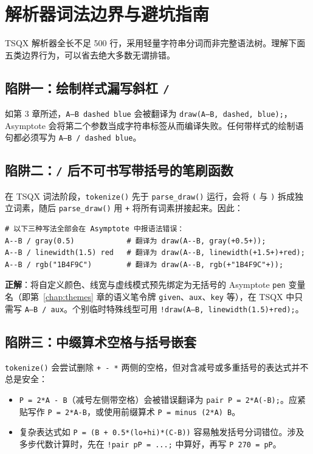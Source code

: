 \documentclass[11pt,oneside,fontset=none]{ctexbook}
\newcommand{\code}[1]{\texttt{#1}}
\begin{document}
\chapter{解析器词法边界与避坑指南}
\label{chap:pitfalls}

TSQX 解析器全长不足 500 行，采用轻量字符串分词而非完整语法树。理解下面五类边界行为，可以省去绝大多数无谓排错。

\section{陷阱一：绘制样式漏写斜杠 \texttt{/}}

如第 3 章所述，\code{A--B dashed blue} 会被翻译为 \code{draw(A--B, dashed, blue);}，Asymptote 会将第二个参数当成字符串标签从而编译失败。任何带样式的绘制语句都必须写为 \code{A--B / dashed blue}。

\section{陷阱二：\texttt{/} 后不可书写带括号的笔刷函数}

在 TSQX 词法阶段，\code{tokenize()} 先于 \code{parse\_draw()} 运行，会将 \code{(} 与 \code{)} 拆成独立词素，随后 \code{parse\_draw()} 用 \code{+} 将所有词素拼接起来。因此：
\begin{lstlisting}[language={}]
# 以下三种写法全部会在 Asymptote 中报语法错误：
A--B / gray(0.5)            # 翻译为 draw(A--B, gray(+0.5+));
A--B / linewidth(1.5) red   # 翻译为 draw(A--B, linewidth(+1.5+)+red);
A--B / rgb("1B4F9C")        # 翻译为 draw(A--B, rgb(+"1B4F9C"+));
\end{lstlisting}

\textbf{正解}：将自定义颜色、线宽与虚线模式预先绑定为无括号的 Asymptote \code{pen} 变量名（即第~\ref{chap:themes} 章的语义笔令牌 \code{given}、\code{aux}、\code{key} 等），在 TSQX 中只需写 \code{A--B / aux}。个别临时特殊线型可用 \code{!draw(A--B, linewidth(1.5)+red);}。

\section{陷阱三：中缀算术空格与括号嵌套}

\code{tokenize()} 会尝试删除 \code{+ - *} 两侧的空格，但对含减号或多重括号的表达式并不总是安全：
\begin{itemize}
  \item \code{P = 2*A - B}（减号左侧带空格）会被错误翻译为 \code{pair P = 2*A(-B);}。应紧贴写作 \code{P = 2*A-B}，或使用前缀算术 \code{P = minus (2*A) B}。
  \item 复杂表达式如 \code{P = (B + 0.5*(lo+hi)*(C-B))} 容易触发括号分词错位。涉及多步代数计算时，先在 \code{!pair pP = ...;} 中算好，再写 \code{P 270 = pP}。
\end{itemize}
\end{document}
